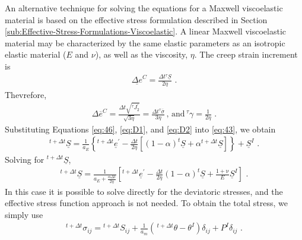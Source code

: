 An alternative technique for solving the equations for a Maxwell viscoelastic
material is based on the effective stress formulation described in
Section \vref{sub:Effective-Stress-Formulations-Viscoelastic}. A linear
Maxwell viscoelastic material may be characterized by the same elastic
parameters as an isotropic elastic material ($E$ and $\nu$), as
well as the viscosity, $\eta$. The creep strain increment is
\begin{gather}
\underline{\Delta e}^{C}=\frac{\Delta t\phantom{}^{\tau}\underline{S}}{2\eta}\,\,.\label{eq:D1}
\end{gather}
Thevrefore,
\begin{gather}
\Delta\overline{e}^{C}=\frac{\Delta t\sqrt{^{\tau}J_{2}^{\prime}}}{\sqrt{3\eta}}=\frac{\Delta t\phantom{}^{\tau}\overline{\sigma}}{3\eta}\,,\,\mathrm{and}\,^{\tau}\gamma=\frac{1}{2\eta}\,\,.\label{eq:D2}
\end{gather}
Substituting Equations \vref{eq:46}, \vref{eq:D1}, and \vref{eq:D2}
into \vref{eq:43}, we obtain
\begin{gather}
^{t+\Delta t}\underline{S}=\frac{1}{a_{E}}\left\{ ^{t+\Delta t}\underline{e}^{\prime}-\frac{\Delta t}{2\eta}\left[(1-\alpha)^{t}\underline{S}+\alpha\phantom{}^{t+\Delta t}\underline{S}\right]\right\} +\underline{S}^{I}\,\,.\label{eq:D3}
\end{gather}
Solving for $^{t+\Delta t}\underline{S}$,
\begin{gather}
^{t+\Delta t}\underline{S}=\frac{1}{a_{E}+\frac{\alpha\Delta t}{2\eta}}\left[^{t+\Delta t}\underline{e}^{\prime}-\frac{\Delta t}{2\eta}(1-\alpha)^{t}\underline{S}+\frac{1+\mathrm{\nu}}{E}\underline{S}^{I}\right]\,\,.\label{eq:D4}
\end{gather}
In this case it is possible to solve directly for the deviatoric stresses,
and the effective stress function approach is not needed. To obtain
the total stress, we simply use
\begin{gather}
^{t+\Delta t}\sigma_{ij}=\phantom{}^{t+\Delta t}S_{ij}+\frac{\mathit{1}}{a_{m}}\left(\,^{t+\Delta t}\theta-\theta^{I}\right)\delta_{ij}+P^{I}\delta_{ij}\,\,.\label{eq:D5}
\end{gather}


